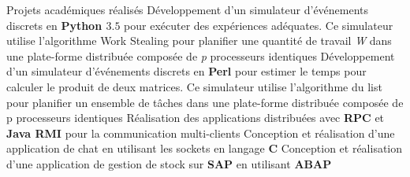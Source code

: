\begin{rubric}{Projets académiques réalisés}
%
    \entry*[]      	Développement d'un simulateur d'événements discrets en \textbf{Python $3.5$} pour exécuter des expériences adéquates. Ce simulateur utilise l'algorithme Work Stealing pour planifier une quantité de travail \textit{W} dans une plate-forme distribuée composée de \textit{p} processeurs identiques
\entry*[]	Développement d'un simulateur d'événements discrets en \textbf{Perl} pour estimer le temps pour calculer le produit de deux matrices. Ce simulateur utilise l'algorithme du list pour planifier un ensemble de tâches dans une plate-forme distribuée composée de p processeurs identiques
\entry*[]	Réalisation des applications distribuées avec \textbf{RPC} et \textbf{Java RMI} pour la communication multi-clients
\entry*[]	Conception et réalisation d’une application de chat en utilisant les sockets en langage \textbf{C}
\entry*[]	Conception et réalisation d’une application de gestion de stock sur \textbf{SAP} en utilisant \textbf{ABAP}
\end{rubric}
